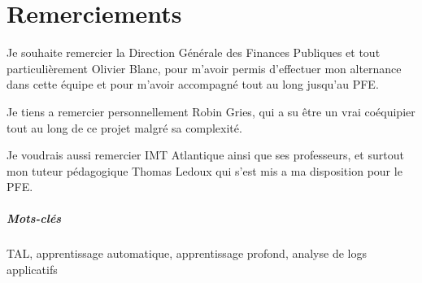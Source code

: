 \documentclass[openany, 12pt]{memoir}
\newcommand\chapters[1]{
	\chapter*{#1}
	\addcontentsline{toc}{chapter}{#1}
}
\begin{document}
\tableofcontents

\newpage
\chapters{Remerciements}
Je souhaite remercier la Direction Générale des Finances Publiques et tout particulièrement Olivier Blanc, pour m'avoir permis d'effectuer mon alternance dans cette équipe et pour m'avoir accompagné tout au long jusqu'au PFE.

\bigskip
Je tiens a remercier personnellement Robin Gries, qui a su être un vrai coéquipier tout au long de ce projet malgré sa complexité.

\bigskip
Je voudrais aussi remercier IMT Atlantique ainsi que ses professeurs, et surtout mon tuteur pédagogique Thomas Ledoux qui s'est mis a ma disposition pour le PFE.

\newpage
\begin{abstract}
Les \glspl{log} sont une source importante de données détaillant le fonctionnement interne d'une application, mais ne sont pourtant que rarement utilisés a leur plein potentiel. Dans ce mémoire, je vais détailler le processus d'évolution d'un outil d'\gls{ml} qui utilise les \glspl{log} pour détecter et même tenter de prévoir des anomalies logicielles. Le projet s'apparentant plus a un projet de recherche, la démarche scientifique sera détaillée, ainsi que les caractéristiques techniques et le déroulement de l'implémentation. L'organisation du projet avec un stagiaire et moi-même sera développée, ainsi que ses impacts humains et économiques.
\end{abstract}

{ 
\begin{abstract}
\Glspl{log} are an important source of data when it comes to the internal workings of software, but they are rarely used to their full potential. In this memoir, I will explain the evolution of a machine learning tool which uses \glspl{log} to detect and even attempt to predict software anomalies. The project being similar to a research project, the scientific protocol will be detailed, as well as the technical characteristics and the course of the implementation. Project management with an intern and myself will be developed, as well as the human and economic impacts of the project.
\end{abstract}}

\paragraph{Mots-clés}
\gls{TAL}, apprentissage automatique, apprentissage profond, analyse de logs applicatifs
\end{document}
